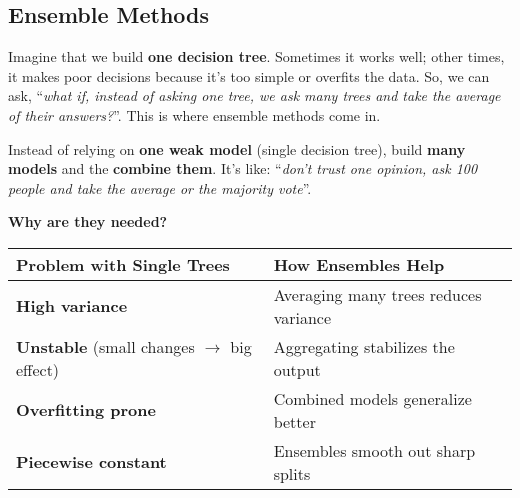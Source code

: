 \subsection{Ensemble Methods}

Imagine that we build \textbf{one decision tree}. Sometimes it works well; other times, it makes poor decisions because it's too simple or overfits the data. So, we can ask, ``\emph{what if, instead of asking one tree, we ask many trees and take the average of their answers?}''. This is where ensemble methods come in.

\highspace
Instead of relying on \textbf{one weak model} (single decision tree),  build \textbf{many models} and the \textbf{combine them}. It's like: ``\emph{don't trust one opinion, ask 100 people and take the average or the majority vote}''.

\highspace
\begin{flushleft}
    \textcolor{Green3}{ \textbf{Why are they needed?}}
\end{flushleft}
\begin{table}[!htp]
    \centering
    \begin{adjustbox}{width={\textwidth},totalheight={\textheight},keepaspectratio}
        \begin{tabular}{@{} l l @{}}
            \toprule
            Problem with Single Trees & How Ensembles Help \\
            \midrule
            \textbf{High variance}                                      & Averaging many trees reduces variance \\ [.3em]
            \textbf{Unstable} (small changes $\rightarrow$ big effect)  & Aggregating stabilizes the output     \\ [.3em]
            \textbf{Overfitting prone}                                  & Combined models generalize better     \\ [.3em]
            \textbf{Piecewise constant}                                 & Ensembles smooth out sharp splits     \\
            \bottomrule
        \end{tabular}
    \end{adjustbox}
\end{table}

